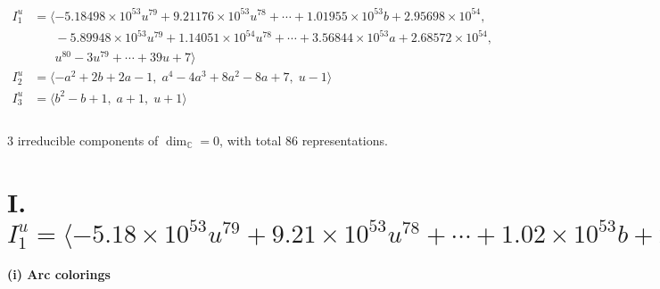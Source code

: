 \documentclass[1p]{elsarticle_modified}
\theoremstyle{definition}
\begin{document}
\begin{align*}
I^u_{1}&=\langle 
-5.18498\times10^{53} u^{79}+9.21176\times10^{53} u^{78}+\cdots+1.01955\times10^{53} b+2.95698\times10^{54},\\
\phantom{I^u_{1}}&\phantom{= \langle  }-5.89948\times10^{53} u^{79}+1.14051\times10^{54} u^{78}+\cdots+3.56844\times10^{53} a+2.68572\times10^{54},\\
\phantom{I^u_{1}}&\phantom{= \langle  }u^{80}-3 u^{79}+\cdots+39 u+7\rangle \\
I^u_{2}&=\langle 
- a^2+2 b+2 a-1,\;a^4-4 a^3+8 a^2-8 a+7,\;u-1\rangle \\
I^u_{3}&=\langle 
b^2- b+1,\;a+1,\;u+1\rangle \\
\\
\end{align*}
\raggedright * 3 irreducible components of $\dim_{\mathbb{C}}=0$, with total 86 representations.\\
\newpage
\renewcommand{\arraystretch}{1}
\centering \section*{I. $I^u_{1}= \langle -5.18\times10^{53} u^{79}+9.21\times10^{53} u^{78}+\cdots+1.02\times10^{53} b+2.96\times10^{54},\;-5.90\times10^{53} u^{79}+1.14\times10^{54} u^{78}+\cdots+3.57\times10^{53} a+2.69\times10^{54},\;u^{80}-3 u^{79}+\cdots+39 u+7 \rangle$}
\flushleft \textbf{(i) Arc colorings}\\
\end{document}
